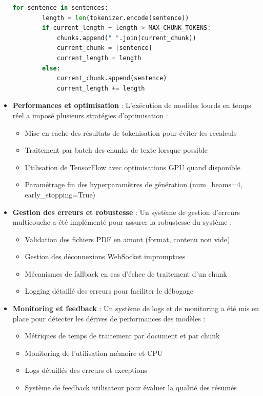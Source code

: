 \documentclass[12pt]{rapportPfe}
\begin{document}
\begin{itemize}
\begin{lstlisting}[language=Python, caption=Algorithme de segmentation adaptatif]
    for sentence in sentences:
        length = len(tokenizer.encode(sentence))
        if current_length + length > MAX_CHUNK_TOKENS:
            chunks.append(" ".join(current_chunk))
            current_chunk = [sentence]
            current_length = length
        else:
            current_chunk.append(sentence)
            current_length += length
    \end{lstlisting}

    \item \textbf{Performances et optimisation} : L'exécution de modèles lourds en temps réel a imposé plusieurs stratégies d'optimisation :
    \begin{itemize}
        \item Mise en cache des résultats de tokenisation pour éviter les recalculs
        \item Traitement par batch des chunks de texte lorsque possible
        \item Utilisation de TensorFlow avec optimisations GPU quand disponible
        \item Paramétrage fin des hyperparamètres de génération (num\_beams=4, early\_stopping=True)
    \end{itemize}

    \item \textbf{Gestion des erreurs et robustesse} : Un système de gestion d'erreurs multicouche a été implémenté pour assurer la robustesse du système :
    \begin{itemize}
        \item Validation des fichiers PDF en amont (format, contenu non vide)
        \item Gestion des déconnexions WebSocket impromptues
        \item Mécanismes de fallback en cas d'échec de traitement d'un chunk
        \item Logging détaillé des erreurs pour faciliter le débogage
    \end{itemize}

    \item \textbf{Monitoring et feedback} : Un système de logs et de monitoring a été mis en place pour détecter les dérives de performances des modèles :
    \begin{itemize}
        \item Métriques de temps de traitement par document et par chunk
        \item Monitoring de l'utilisation mémoire et CPU
        \item Logs détaillés des erreurs et exceptions
        \item Système de feedback utilisateur pour évaluer la qualité des résumés
    \end{itemize}


\end{itemize}
\end{document}
